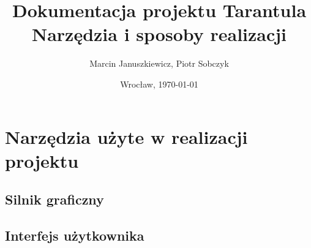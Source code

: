 \documentclass[11pt,leqno]{article}
\title{\LARGE Dokumentacja projektu \textbf{Tarantula}\\
							Narzędzia i sposoby realizacji}
\author{Marcin Januszkiewicz, Piotr Sobczyk}
\date{Wrocław, \today}
\begin{document}
\maketitle 
\newpage
\tableofcontents
\newpage


\section{Narzędzia użyte w realizacji projektu}

\subsection{Silnik graficzny}


\subsection{Interfejs użytkownika}
\end{document}
